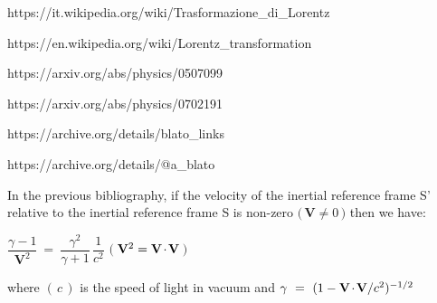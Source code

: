 \documentclass[10pt,fleqn]{article}
\begin{document}
\newpage

\par {}

\bigskip \smallskip

\par \noindent https://it.wikipedia.org/wiki/Trasformazione\_di\_Lorentz
\bigskip \medskip
\par \noindent https://en.wikipedia.org/wiki/Lorentz\_transformation
\bigskip \medskip
\par \noindent https://arxiv.org/abs/physics/0507099
\bigskip \medskip
\par \noindent https://arxiv.org/abs/physics/0702191
\bigskip \medskip
\par \noindent https://archive.org/details/blato\_links
\bigskip \medskip
\par \noindent https://archive.org/details/@a\_blato

\par \vspace{+1.20em}

\par {}

\bigskip \medskip

\noindent In the previous bibliography, if the velocity of the inertial reference frame S' relative to the inertial reference frame S is non-zero $( \, ${\small $\mathbf{V} \ne 0$}$ \, )$ then we have:

\par \vspace{+1.80em}

$\dfrac{\gamma - 1}{\mathbf{V}^2} ~=~ \dfrac{\gamma^2}{\gamma + 1} \, \dfrac{1}{c^2}$ \hspace{+2.40em} $( \: ${\small $\mathbf{V}^2 = \mathbf{V} \hspace{-0.114em}\cdot\hspace{-0.114em} \mathbf{V}$}$ \: )$

\par \vspace{+2.10em}

\noindent where $( \, c \, )$ is the speed of light in vacuum and \hbox {{\small $\gamma ~=~ ({1 - \mathbf{V} \hspace{-0.114em}\cdot\hspace{-0.114em} \mathbf{V}/c^2})^{-1/2}$}}
\end{document}

